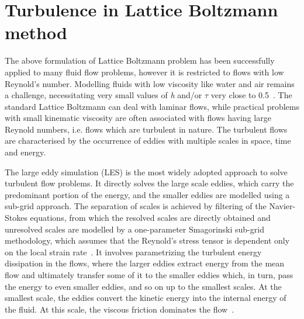 
\section{Turbulence in Lattice Boltzmann method}

The above formulation of Lattice Boltzmann problem has been successfully 
applied to many fluid flow problems, however it is restricted to flows with low 
Reynold's number. Modelling fluids with low viscosity like water and air 
remains a challenge, necessitating very small values of \textit{h} and/or 
$\tau$ very close to 0.5~\citep{He1997}. The standard Lattice Boltzmann can 
deal with laminar flows, while practical problems with small kinematic 
viscosity are often associated with flows having large Reynold numbers, i.e. 
flows which are turbulent in nature. The turbulent flows are characterised by 
the occurrence of eddies with multiple scales in space, time and energy.

The large eddy simulation (LES) is the most widely adopted approach to 
solve turbulent flow problems. It directly solves the large scale eddies, which 
carry the predominant portion of the energy, and the smaller eddies are 
modelled using a sub-grid approach. The separation of scales is achieved by 
filtering of the Navier-Stokes equations, from which the resolved scales are 
directly obtained and unresolved scales are modelled by a one-parameter 
Smagorinski sub-grid methodology, which assumes that the Reynold's stress 
tensor is dependent only on the local strain rate~\citep{Smagorinsky1963}. It 
involves parametrizing the turbulent energy dissipation in the flows, where the 
larger eddies extract energy from the mean flow and ultimately transfer some of 
it to the smaller eddies which, in turn, pass the energy to even smaller 
eddies, and so on up to the smallest scales. At the smallest scale, the eddies 
convert the kinetic energy into the internal energy of the fluid. At this 
scale, the viscous friction dominates the flow~\citep{Frisch1995}.


